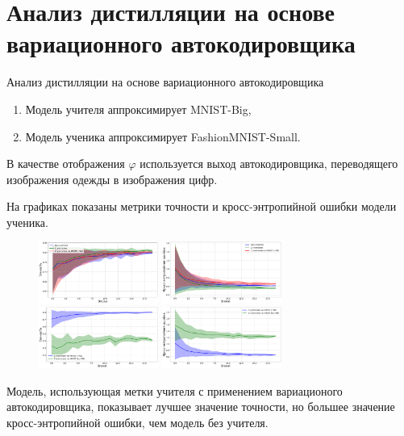 \documentclass[10pt,pdf,hyperref={unicode}]{beamer}
\begin{document}
\section{Анализ дистилляции на основе вариационного автокодировщика}
\begin{frame}{Анализ дистилляции на основе вариационного автокодировщика}
\justifying
\begin{enumerate}[1)]
    \item Модель учителя аппроксимирует MNIST-Big,
    \item Модель ученика аппроксимирует FashionMNIST-Small.
\end{enumerate}

\par
В качестве отображения $\varphi$ используется выход автокодировщика, переводящего изображения одежды в изображения цифр.

На графиках показаны метрики точности и кросс-энтропийной ошибки модели ученика.

\begin{figure}[h!]
\includegraphics[width=0.35\textwidth]{results/vae_acc.png}
\includegraphics[width=0.35\textwidth]{results/vae_loss.png}
\includegraphics[width=0.35\textwidth]{results/vae_acc_comparison.png}
\includegraphics[width=0.35\textwidth]{results/vae_loss_comparison.png}
\end{figure}

Модель, использующая метки учителя с применением вариационого автокодировщика, показывает лучшее значение точности, но большее значение кросс-энтропийной ошибки, чем модель без учителя.

\end{frame}
\end{document}
